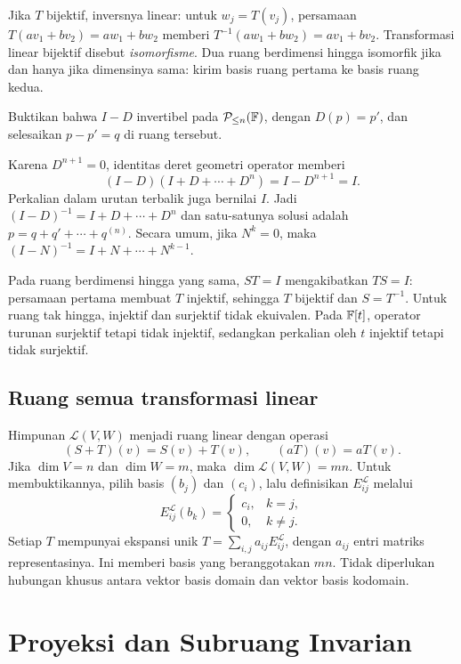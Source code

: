 Jika $T$ bijektif, inversnya linear: untuk $w_j=T(v_j)$,
persamaan $T(av_1+bv_2)=aw_1+bw_2$ memberi
$T^{-1}(aw_1+bw_2)=av_1+bv_2$.
Transformasi linear bijektif disebut \emph{isomorfisme}.
Dua ruang berdimensi hingga isomorfik jika dan hanya jika
dimensinya sama: kirim basis ruang pertama ke basis ruang kedua.

\begin{exam}
    Buktikan bahwa $I-D$ invertibel pada $\mathcal P_{\le n}(\mathbb{F})$,
    dengan $D(p)=p'$, dan selesaikan $p-p'=q$ di ruang tersebut.
\end{exam}
\begin{solution}
    Karena $D^{n+1}=0$, identitas deret geometri operator memberi
    \[
        (I-D)(I+D+\cdots+D^n)=I-D^{n+1}=I.
    \]
    Perkalian dalam urutan terbalik juga bernilai $I$.
    Jadi $(I-D)^{-1}=I+D+\cdots+D^n$ dan satu-satunya solusi
    adalah $p=q+q'+\cdots+q^{(n)}$.
    Secara umum, jika $N^k=0$, maka
    $(I-N)^{-1}=I+N+\cdots+N^{k-1}$.
\end{solution}

Pada ruang berdimensi hingga yang sama, $ST=I$ mengakibatkan
$TS=I$: persamaan pertama membuat $T$ injektif, sehingga
$T$ bijektif dan $S=T^{-1}$.
Untuk ruang tak hingga, injektif dan surjektif tidak ekuivalen.
Pada $\mathbb{F}[t]$, operator turunan surjektif tetapi tidak injektif,
sedangkan perkalian oleh $t$ injektif tetapi tidak surjektif.

\subsection{Ruang semua transformasi linear}
Himpunan $\mathcal L(V,W)$ menjadi ruang linear dengan operasi
\[
    (S+T)(v)=S(v)+T(v),\qquad (aT)(v)=aT(v).
\]
Jika $\dim V=n$ dan $\dim W=m$, maka
$\dim\mathcal L(V,W)=mn$.
Untuk membuktikannya, pilih basis $(b_j)$ dan $(c_i)$, lalu
definisikan $E_{ij}^{\mathcal L}$ melalui
\[
    E_{ij}^{\mathcal L}(b_k)=\begin{cases}c_i,&k=j,\\0,&k\ne j.\end{cases}
\]
Setiap $T$ mempunyai ekspansi unik
$T=\sum_{i,j}a_{ij}E_{ij}^{\mathcal L}$, dengan $a_{ij}$ entri
matriks representasinya. Ini memberi basis yang beranggotakan $mn$.
Tidak diperlukan hubungan khusus antara vektor basis domain
dan vektor basis kodomain.

\section{Proyeksi dan Subruang Invarian}

